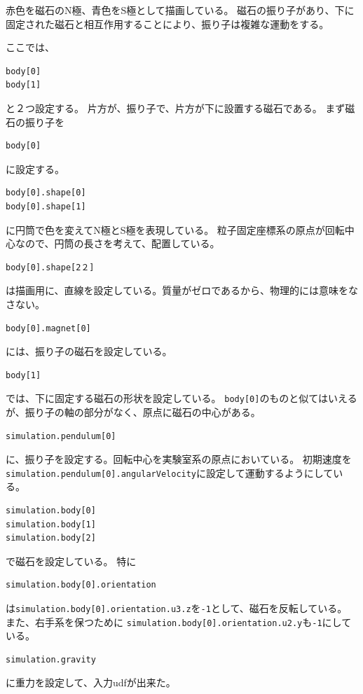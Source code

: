 \documentclass[a4paper,11pt]{jarticle}
\begin{document}
赤色を磁石のN極、青色をS極として描画している。
磁石の振り子があり、下に固定された磁石と相互作用することにより、振り子は複雑な運動をする。

ここでは、
\begin{verbatim}
body[0]
body[1]
\end{verbatim}
と２つ設定する。
片方が、振り子で、片方が下に設置する磁石である。
まず磁石の振り子を
\begin{verbatim}
body[0]
\end{verbatim}
に設定する。
\begin{verbatim}
body[0].shape[0]
body[0].shape[1]
\end{verbatim}
に円筒で色を変えてN極とS極を表現している。
粒子固定座標系の原点が回転中心なので、円筒の長さを考えて、配置している。
\begin{verbatim}
body[0].shape[2２]
\end{verbatim}
は描画用に、直線を設定している。質量がゼロであるから、物理的には意味をなさない。

\begin{verbatim}
body[0].magnet[0]
\end{verbatim}
には、振り子の磁石を設定している。

\begin{verbatim}
body[1]
\end{verbatim}
では、下に固定する磁石の形状を設定している。
\verb|body[0]|のものと似てはいえるが、振り子の軸の部分がなく、原点に磁石の中心がある。

\begin{verbatim}
simulation.pendulum[0]
\end{verbatim}
に、振り子を設定する。回転中心を実験室系の原点においている。
初期速度を\verb|simulation.pendulum[0].angularVelocity|に設定して運動するようにしている。
\begin{verbatim}
simulation.body[0]
simulation.body[1]
simulation.body[2]
\end{verbatim}
で磁石を設定している。
特に
\begin{verbatim}
simulation.body[0].orientation
\end{verbatim}
は\verb|simulation.body[0].orientation.u3.z|を\verb|-1|として、磁石を反転している。
また、右手系を保つために
\verb|simulation.body[0].orientation.u2.y|も\verb|-1|にしている。

\begin{verbatim}
simulation.gravity
\end{verbatim}
に重力を設定して、入力udfが出来た。
\end{document}

